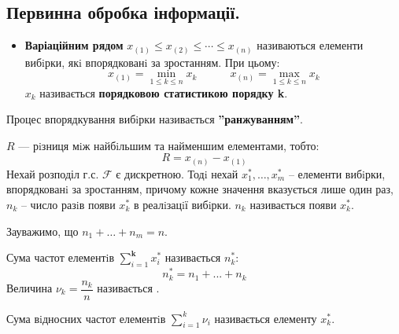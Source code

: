 \subsection{Первинна обробка інформації.}
\begin{itemize}
    \item \textbf{\color{javared}Варіаційним рядом} $x_{(1)} \leq x_{(2)} \leq \cdots \leq x_{(n)} $ називаються елементи вибiрки, якi
впорядкованi за зростанням. При цьому:
$$
x_{(1)} = \min\limits_{1 \leq k \leq n} x_k \qquad \quad x_{(n)} = \max\limits_{1 \leq k \leq n} x_k
$$
$x_k$ називається \textbf{\color{javadocblue}порядковою статистикою порядку k}.
\end{itemize}
Процес впорядкування вибiрки називається \textbf{\color{javadocblue}''ранжуванням''}.\par
{} $R$ --- рiзниця мiж найбiльшим та найменшим елементами, тобто:
$$
R = x_{(n)} - x_{(1)}
$$
Нехай розподіл г.с. $\mathcal{F}$ є дискретною. Тодi нехай $x_1^* , \dots , x_m^*$ – елементи вибiрки, впорядкованi
за зростанням, причому кожне значення вказується лише один раз, $n_k$ – число разiв появи $x_k^*$ в реалiзацiї вибiрки.  $n_k$ називається  появи $x_k^*$.\par
Зауважимо, що $n_1 + \dots + n_m = n$.\par
Сума частот елементiв $ \displaystyle\sum\limits_{i = 1}^{ \textbf{k}}{x_i^*}$ називається  $n_k^*$:
$$
n_k^* = n_1 + ... + n_k
$$
Величина $\nu_k = \dfrac{n_k}{n}$ називається .\par
Сума вiдносних частот елементiв $\displaystyle  \sum\limits_{i = 1}^{k}{ \nu_i}$ називається  елементу $x_k^*$.\par
\newpage
